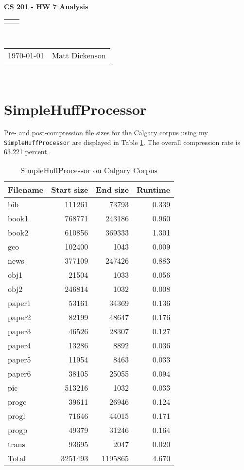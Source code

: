 \documentclass[12pt]{article}
\renewcommand{\title}[1]{\textbf{#1}\\}
\renewcommand{\line}{\begin{tabularx}{\textwidth}{X>{\raggedleft}X}\hline\\\end{tabularx}\\[-0.5cm]}
\newcommand{\leftright}[2]{\begin{tabularx}{\textwidth}{X>{\raggedleft}X}#1%
& #2\\\end{tabularx}\\[-0.5cm]}
\begin{document}
\title{CS 201 - HW 7 Analysis}
\line
\leftright{\today}{Matt Dickenson} %
\setlength{\parindent}{16pt}

\section{SimpleHuffProcessor}

Pre- and post-compression file sizes for the Calgary corpus using my \texttt{SimpleHuffProcessor} are displayed in Table \ref{simple-calgary}. The overall compression rate is 63.221 percent.

\begin{table}
\caption{SimpleHuffProcessor on Calgary Corpus}
\label{simple-calgary}
\begin{tabular}{lrrr}
\toprule
Filename & Start size & End size & Runtime \\
\midrule
bib &	 111261 & 73793 & 0.339 \\
book1 &	 768771 & 243186 & 0.960 \\
book2 &	 610856 & 369333 & 1.301 \\
geo &	 102400 & 1043 & 0.009 \\
news &	 377109 & 247426 & 0.883 \\
obj1 &	 21504 & 1033 & 0.056 \\
obj2 &	 246814 & 1032 & 0.008 \\
paper1 &	 53161 & 34369 & 0.136 \\
paper2 &	 82199 & 48647 & 0.176 \\
paper3 &	 46526 & 28307 & 0.127 \\
paper4 &	 13286 & 8892 & 0.036 \\
paper5 &	 11954 & 8463 & 0.033 \\
paper6 &	 38105 & 25055 & 0.094 \\
pic &	 513216 & 1032 & 0.033 \\
progc &	 39611 & 26946 & 0.124 \\
progl &	 71646 & 44015 & 0.171 \\
progp &	 49379 & 31246 & 0.164 \\
trans &	 93695 & 2047 & 0.020 \\
\midrule
Total & 3251493 & 1195865 & 4.670 \\
\bottomrule
\end{tabular}
\end{table}
\end{document}
